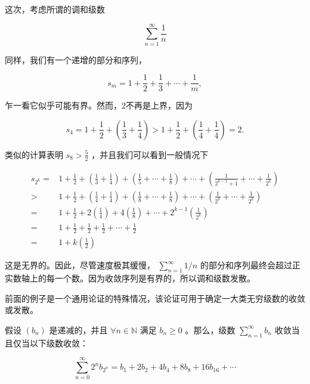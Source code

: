 \begin{Eg}[调和级数]
  \label{eg:2.4.5}
这次，考虑所谓的调和级数

\[
\mathop{\sum }\limits_{{n = 1}}^{\infty }\frac{1}{n}
\]

同样，我们有一个递增的部分和序列，

\[
{s}_{m} = 1 + \frac{1}{2} + \frac{1}{3} + \cdots  + \frac{1}{m},
\]

乍一看它似乎可能有界。然而，$2$不再是上界，因为

\[
{s}_{4} = 1 + \frac{1}{2} + \left( {\frac{1}{3} + \frac{1}{4}}\right)  > 1 + \frac{1}{2} + \left( {\frac{1}{4} + \frac{1}{4}}\right)  = 2.
\]

类似的计算表明 \({s}_{8} > \frac{5}{2}\) ，并且我们可以看到一般情况下

\begin{align*}
{s}_{{2}^{k}} = & 1 + \frac{1}{2} + \left( {\frac{1}{3} + \frac{1}{4}}\right)  + \left( {\frac{1}{5} + \cdots  + \frac{1}{8}}\right)  + \cdots  + \left( {\frac{1}{{2}^{k - 1} + 1} + \cdots  + \frac{1}{{2}^{k}}}\right)\\
> &1 + \frac{1}{2} + \left( {\frac{1}{4} + \frac{1}{4}}\right)  + \left( {\frac{1}{8} + \cdots  + \frac{1}{8}}\right)  + \cdots  + \left( {\frac{1}{{2}^{k}} + \cdots  + \frac{1}{{2}^{k}}}\right)\\
= & 1 + \frac{1}{2} + 2\left( \frac{1}{4}\right)  + 4\left( \frac{1}{8}\right)  + \cdots  + {2}^{k - 1}\left( \frac{1}{{2}^{k}}\right)\\
=&  1 + \frac{1}{2} + \frac{1}{2} + \frac{1}{2} + \cdots  + \frac{1}{2}\\
=& 1 + k\left( \frac{1}{2}\right)
\end{align*}


这是无界的。因此，尽管速度极其缓慢， \(\mathop{\sum }\limits_{{n = 1}}^{\infty }1/n\) 的部分和序列最终会超过正实数轴上的每一个数。因为收敛序列是有界的，所以调和级数发散。  
\end{Eg}

前面的例子是一个通用论证的特殊情况，该论证可用于确定一大类无穷级数的收敛或发散。


\begin{Thm}[Cauchy判敛法]
  \label{thm:2.4.6}
假设 \(\left( {b}_{n}\right)\) 是递减的，并且 \(\forall n \in  \mathbb{N}\) 满足 \({b}_{n} \geq  0\) 。那么，级数 \(\mathop{\sum }\limits_{{n = 1}}^{\infty }{b}_{n}\) 收敛当且仅当以下级数收敛：

\[
\mathop{\sum }\limits_{{n = 0}}^{\infty }{2}^{n}{b}_{{2}^{n}} = {b}_{1} + 2{b}_{2} + 4{b}_{4} + 8{b}_{8} + {16}{b}_{16} + \cdots
\]

\end{Thm}


